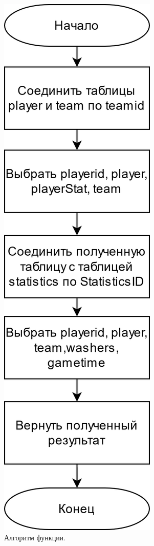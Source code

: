 \begin{figure}[h!]
	\centering
	\includegraphics[scale=0.30]{img/func.png}
	\caption{Алгоритм функции.}
	\label{img:func}
\end{figure}
\newpage
